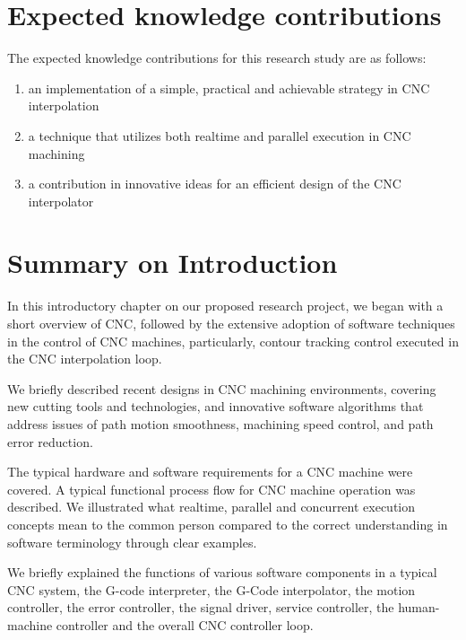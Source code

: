 \section{Expected knowledge contributions}

The expected knowledge contributions for this research study are as follows:
\begin{enumerate}
	\item an implementation of a simple, practical and achievable strategy in CNC interpolation 
	\item a technique that utilizes both realtime and parallel execution in CNC machining
	\item a contribution in innovative ideas for an efficient design of the CNC interpolator 
\end{enumerate}

\pagebreak
\section{Summary on Introduction}

In this introductory chapter on our proposed research project, we began with a short overview of CNC, followed by the extensive adoption of software techniques in the control of CNC machines, particularly, contour tracking control executed in the CNC interpolation loop. 
\vspace*{1\baselineskip}
	
We briefly described recent designs in CNC machining environments, covering new cutting tools and technologies, and innovative software algorithms that address issues of path motion smoothness, machining speed control, and path error reduction.  
\vspace*{1\baselineskip}
	
The typical hardware and software requirements for a CNC machine were covered. A typical functional process flow for CNC machine operation was described. We illustrated what realtime, parallel and concurrent execution concepts mean to the common person compared to the correct understanding in software terminology through clear examples.
\vspace*{1\baselineskip}
	
We briefly explained the functions of various software components in a typical CNC system, the G-code interpreter, the G-Code interpolator, the motion controller, the error controller, the signal driver, service controller, the human-machine controller and the overall CNC controller loop. 
\vspace*{1\baselineskip}

